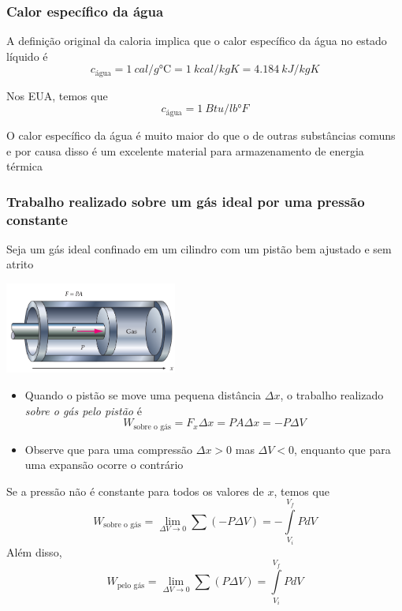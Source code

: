 \documentclass[t,%
brazilian,%
11pt,%
aspectratio=169,%
table%
]{beamer}
\begin{document}
\begin{frame}[c]
    \frametitle{Calor específico da água}
    A definição original da caloria implica que o calor específico da água no estado líquido é
    \[
        c_{\text{água}} = \SI{1}{cal/g \celsius} = \SI{1}{kcal/kg  K} = 
        \SI{4,184}{kJ/kg K}
    \]

    Nos EUA, temos que
    \[
        c_{\text{água}} = \SI{1}{Btu/lb\degree F}
    \]

    O calor específico da água é muito maior do que o de outras substâncias
    comuns e por causa disso é um excelente material para armazenamento de
    energia térmica
\end{frame}

\begin{frame}
    \frametitle{Trabalho realizado sobre um gás ideal por uma pressão constante}
    Seja um gás ideal confinado em um cilindro com um pistão bem ajustado e sem atrito
    \begin{center}
        \includegraphics[width=0.425\textwidth]{images/quasistatic}
    \end{center}
    \begin{itemize}
        \item Quando o pistão se move uma pequena distância $\Delta x$, o
            trabalho realizado \textit{sobre o gás pelo pistão} é
            \[
                W_{\text{sobre~o~gás}} = F_x \Delta x=PA \Delta x=-P\Delta V
            \]
        \item Observe que para uma compressão $\Delta x > 0$ mas $\Delta V <
            0$, enquanto que para uma expansão ocorre o contrário
    \end{itemize}

\end{frame}

\begin{frame}[c]
    Se a pressão não é constante para todos os valores de \(x\), temos que
    \[
        W_{\text{sobre~o~gás}} = \lim_{\Delta V \to 0}  \sum (-P\Delta V) = -\int\limits_{V_i}^{V_f} PdV
    \]
    \pause
    Além disso,
    \[
        W_{\text{pelo~gás}} = \lim_{\Delta V \to 0}  \sum (P\Delta V) = \int\limits_{V_i}^{V_f} PdV
    \]
\end{frame}
\end{document}
